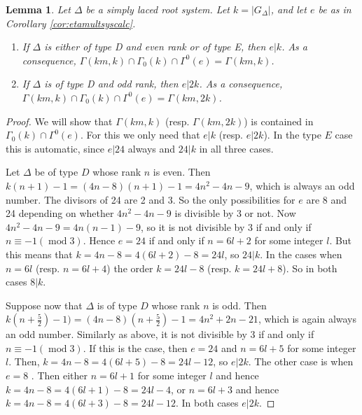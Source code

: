 \documentclass[11pt,a4paper]{amsart}
\newtheorem{lemma}[theorem]{Lemma}
\theoremstyle{definition}
\begin{document}
\begin{lemma} 
\label{lem:grpint}
Let $\Delta$ be a simply laced root system. Let $k=|G_{\Delta}|$, and let $e$ be as in Corollary \ref{cor:etamultsyscalc}. 
\begin{enumerate}
\item If $\Delta$ is either of type D and even rank or of type E, then $e|k$. As a consequence, $\Gamma(km,k) \cap \Gamma_0(k) \cap \Gamma^0(e)=\Gamma(km,k)$.
\item If $\Delta$ is of type D and odd rank, then $e|2k$. As a consequence, $\Gamma(km,k) \cap \Gamma_0(k) \cap \Gamma^0(e)=\Gamma(km,2k)$.
\end{enumerate}
\end{lemma}
\begin{proof}
We will show that $\Gamma(km,k)$ (resp. $\Gamma(km,2k)$) is contained in $\Gamma_0(k) \cap \Gamma^0(e)$. For this we only need that $e|k$ (resp. $e|2k$). In the type $E$ case this is automatic, since $e|24$ always and $24|k$ in all three cases.

Let $\Delta$ be of type $D$ whose rank $n$ is even. Then $k(n+1)-1=(4n-8)(n+1)-1=4n^2-4n-9$, which is always an odd number. The divisors of 24 are 2 and 3. So the only possibilities for $e$ are 8 and 24 depending on whether $4n^2-4n-9$ is divisible by 3 or not. Now $4n^2-4n-9=4n(n-1)-9$, so it is not divisible by 3 if and only if $n \equiv -1 (\; \mathrm{mod}\; 3)$. Hence $e=24$ if and only if $n=6l+2$ for some integer $l$. But this means that $k=4n-8=4(6l+2)-8=24l$, so $24|k$. In the cases when $n=6l$ (resp. $n=6l+4$) the order $k=24l-8$ (resp. $k=24l+8$). So in both cases $8|k$. 

Suppose now that $\Delta$ is of type $D$ whose rank $n$ is odd. Then $k(n+\frac{5}{2})-1)=(4n-8)(n+\frac{5}{2})-1=4n^2+2n-21$, which is again always an odd number. Similarly as above, it is not divisible by 3 if and only if $n \equiv -1 (\; \mathrm{mod}\; 3)$.
If this is the case, then $e=24$ and $n=6l+5$ for some integer $l$. Then, $k=4n-8=4(6l+5)-8=24l-12$, so $e|2k$.
The other case is when $e=8$ . Then either $n=6l+1$ for some integer $l$ and hence $k=4n-8=4(6l+1)-8=24l-4$, or $n=6l+3$ and hence $k=4n-8=4(6l+3)-8=24l-12$. In both cases $e|2k$.
\end{proof}
\end{document}
